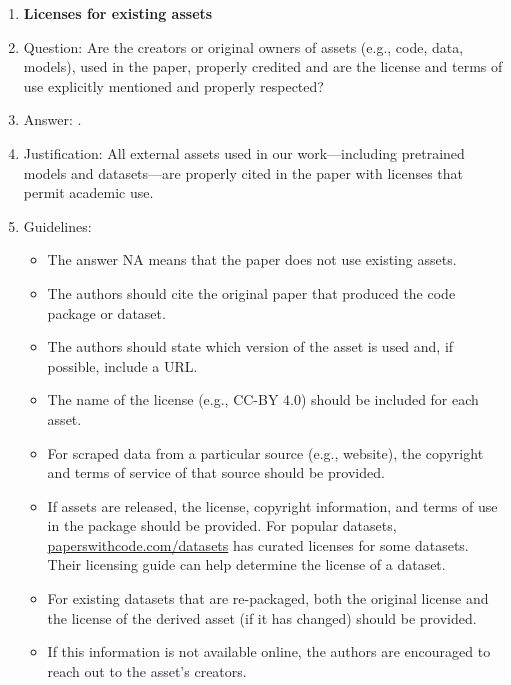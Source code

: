\documentclass{article}
\begin{document}
{\begin{enumerate}
\item {\bf Licenses for existing assets}
    \item[] Question: Are the creators or original owners of assets (e.g., code, data, models), used in the paper, properly credited and are the license and terms of use explicitly mentioned and properly respected?
    \item[] Answer: \answerYes{}.
    \item[] Justification: All external assets used in our work—including pretrained models and datasets—are properly cited in the paper with licenses that permit academic use.
    \item[] Guidelines:
    \begin{itemize}
        \item The answer NA means that the paper does not use existing assets.
        \item The authors should cite the original paper that produced the code package or dataset.
        \item The authors should state which version of the asset is used and, if possible, include a URL.
        \item The name of the license (e.g., CC-BY 4.0) should be included for each asset.
        \item For scraped data from a particular source (e.g., website), the copyright and terms of service of that source should be provided.
        \item If assets are released, the license, copyright information, and terms of use in the package should be provided. For popular datasets, \url{paperswithcode.com/datasets} has curated licenses for some datasets. Their licensing guide can help determine the license of a dataset.
        \item For existing datasets that are re-packaged, both the original license and the license of the derived asset (if it has changed) should be provided.
        \item If this information is not available online, the authors are encouraged to reach out to the asset's creators.
    \end{itemize}


\end{enumerate}}
\end{document}

